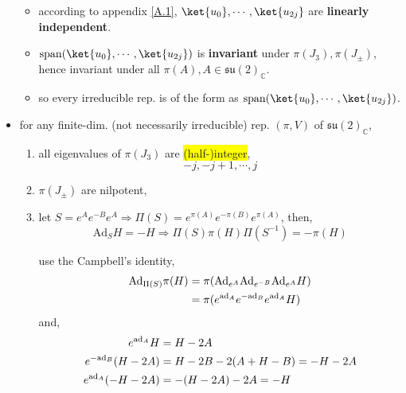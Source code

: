 \begin{itemize}
\begin{tcolorbox}[title=proof:]
		\begin{itemize}
			\item according to appendix \ref{A.1}, $\ket{u_0}, \cdots, \ket{u_{2 j}}$ are \textbf{linearly independent}.
			
			\item $\mathrm{span}(\ket{u_0}, \cdots, \ket{u_{2 j}})$ is \textbf{invariant} under $\pi(J_3), \pi(J_\pm)$, hence invariant under all $\pi(A), A \in \mathfrak{su}(2)_\mathbb{C}$.
			
			\item so every irreducible rep. is of the form as $\mathrm{span}(\ket{u_0}, \cdots, \ket{u_{2 j}})$.
		\end{itemize}
	\end{tcolorbox}
	
	\item for any finite-dim. (not necessarily irreducible) rep. $(\pi, V)$ of $\mathfrak{su}(2)_\mathbb{C}$,
	\begin{enumerate}
		\item all eigenvalues of $\pi(J_3)$ are \colorbox{yellow}{(half-)integer},
		\begin{equation} \label{9.1.6}
			- j, - j + 1, \cdots, j
		\end{equation}
		
		\item $\pi(J_\pm)$ are nilpotent,
		
		\item let $S = e^A e^{- B} e^A \Longrightarrow \Pi(S) = e^{\pi(A)} e^{- \pi(B)} e^{\pi(A)}$, then,
		\begin{equation} \label{9.1.7}
			\mathrm{Ad}_S H = - H \Longrightarrow \Pi(S) \pi(H) \Pi(S^{- 1}) = - \pi(H)
		\end{equation}
		
		\begin{tcolorbox}[title=calculation:]
			use the Campbell's identity,
			\begin{align}
				\mathrm{Ad}_{\Pi(S)} \pi(H) &= \pi(\mathrm{Ad}_{e^A} \mathrm{Ad}_{e^{- B}} \mathrm{Ad}_{e^A} H) \notag \\
				&= \pi(e^{\mathrm{ad}_A} e^{- \mathrm{ad}_B} e^{\mathrm{ad}_A} H)
			\end{align}
			and,
			\begin{align}
				e^{\mathrm{ad}_A} H &= H - 2 A \notag \\
				e^{- \mathrm{ad}_B} (H - 2 A) &= H - 2 B - 2 (A + H - B) = - H - 2 A \notag \\
				e^{\mathrm{ad}_A} (- H - 2 A) &= - (H - 2 A) - 2 A = - H
			\end{align}
			

\end{tcolorbox}
\end{enumerate}
\end{itemize}
